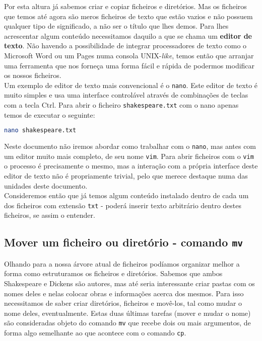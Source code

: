 \documentclass[a4paper, onecolumn, 10pt]{report}
\begin{document}
Por esta altura já sabemos criar e copiar ficheiros e diretórios. Mas os ficheiros que temos até agora são meros ficheiros de texto que estão vazios e não possuem qualquer tipo de significado, a não ser o título que lhes demos. Para lhes acrescentar algum conteúdo necessitamos daquilo a que se chama um \textbf{editor de texto}. Não havendo a possibilidade de integrar processadores de texto como o Microsoft Word ou um Pages numa consola UNIX-\textit{like}, temos então que arranjar uma
ferramenta que nos forneça uma forma fácil e rápida de podermos modificar os nossos ficheiros. \\
Um exemplo de editor de texto mais convencional é o \texttt{nano}. Este editor de texto é muito simples e usa uma interface controlável através de combinações de teclas com a tecla Ctrl. Para abrir o ficheiro \texttt{shakespeare.txt} com o nano apenas temos de executar o seguinte:

\begin{lstlisting}[language=bash, style=console]
nano shakespeare.txt
\end{lstlisting}

Neste documento não iremos abordar como trabalhar com o \texttt{nano}, mas antes com um editor muito mais completo, de seu nome \texttt{vim}. Para abrir ficheiros com o \texttt{vim} o processo é precisamente o mesmo, mas a interação com a própria interface deste editor de texto não é propriamente trivial, pelo que merece destaque numa das unidades deste documento. \\
Consideremos então que já temos algum conteúdo instalado dentro de cada um dos ficheiros com extensão \texttt{txt} - poderá inserir texto arbitrário dentro destes ficheiros, se assim o entender.

\subsection{Mover um ficheiro ou diretório - comando \texttt{mv}}

Olhando para a nossa árvore atual de ficheiros podíamos organizar melhor a forma como estruturamos os ficheiros e diretórios. Sabemos que ambos Shakespeare e Dickens são autores, mas até seria interessante criar pastas com os nomes deles e nelas colocar obras e informações acerca dos mesmos. Para isso necessitamos de saber criar diretórios, ficheiros e movê-los, tal como mudar o nome deles, eventualmente. Estas duas últimas tarefas (mover e mudar o nome) são consideradas objeto do comando
\texttt{mv} que recebe dois ou mais argumentos, de forma algo semelhante ao que acontece com o comando \texttt{cp}. 
\end{document}
